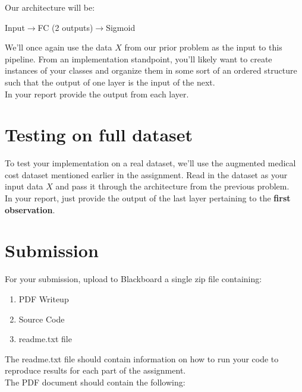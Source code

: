 \documentclass[12pt]{article}
\begin{document}
\noindent
Our architecture will be:\\
\begin{center}
Input$\rightarrow$FC (2 outputs)$\rightarrow$Sigmoid
\end{center}

\noindent
We'll once again use the data $X$ from our prior problem as the input to this pipeline.  From an implementation standpoint, you'll likely want to create instances of your classes and organize them in some sort of an ordered structure such that the output of one layer is the input of the next.\\

\noindent  
 In your report provide the output from each layer.

\newpage
\section{Testing on full dataset}
To test your implementation on a real dataset, we'll use the augmented medical cost dataset mentioned earlier in the assignment.  Read in the dataset as your input data $X$ and pass it through the architecture from the previous problem.\\

\noindent
In your report, just provide the output of the last layer pertaining to the \textbf{first observation}.

\newpage
\section*{Submission}
For your submission, upload to Blackboard a single zip file containing:

\begin{enumerate}
\item PDF Writeup
\item Source Code
\item readme.txt file
\end{enumerate}

\noindent
The readme.txt file should contain information on how to run your code to reproduce results for each part of the assignment.\\

\noindent
The PDF document should contain the following:
\end{document}
